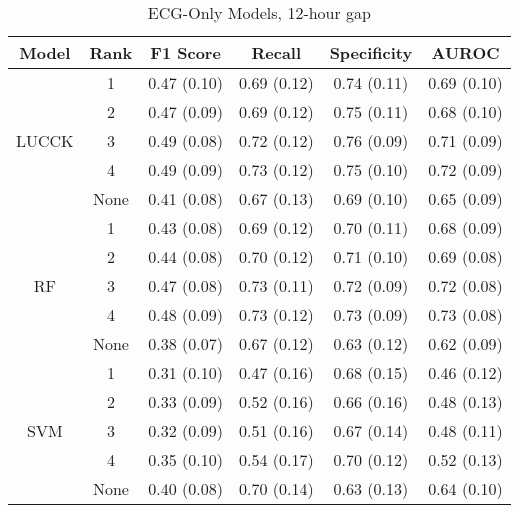 \begin{table}
    \small
    \centering
    \caption{ECG-Only Models, 12-hour gap}
    \begin{tabularx}{\textwidth}{|c|c|C|C|C|C|}
        \hline
        Model & Rank & F1 Score & Recall & Specificity & AUROC \\
        \hline
         & 1 & 0.47 (0.10) & 0.69 (0.12) & 0.74 (0.11) & 0.69 (0.10)\\
         & 2 & 0.47 (0.09) & 0.69 (0.12) & 0.75 (0.11) & 0.68 (0.10)\\
        LUCCK & 3 & 0.49 (0.08) & 0.72 (0.12) & 0.76 (0.09) & 0.71 (0.09)\\
         & 4 & 0.49 (0.09) & 0.73 (0.12) & 0.75 (0.10) & 0.72 (0.09)\\
         & None & 0.41 (0.08) & 0.67 (0.13) & 0.69 (0.10) & 0.65 (0.09)\\
        \hline
        & 1 &  0.43 (0.08) & 0.69 (0.12) & 0.70 (0.11) & 0.68 (0.09)\\
         & 2 & 0.44 (0.08) & 0.70 (0.12) & 0.71 (0.10) & 0.69 (0.08)\\
        RF & 3 & 0.47 (0.08) & 0.73 (0.11) & 0.72 (0.09) & 0.72 (0.08)\\
         & 4 & 0.48 (0.09) & 0.73 (0.12) & 0.73 (0.09) & 0.73 (0.08)\\
         & None & 0.38 (0.07) & 0.67 (0.12) & 0.63 (0.12) & 0.62 (0.09)\\
         \hline
         & 1 & 0.31 (0.10) & 0.47 (0.16) & 0.68 (0.15) & 0.46 (0.12)\\
         & 2 & 0.33 (0.09) & 0.52 (0.16) & 0.66 (0.16) & 0.48 (0.13)\\
        SVM & 3 & 0.32 (0.09) & 0.51 (0.16) & 0.67 (0.14) & 0.48 (0.11)\\
         & 4 & 0.35 (0.10) & 0.54 (0.17) & 0.70 (0.12) & 0.52 (0.13)\\
         & None & 0.40 (0.08) & 0.70 (0.14) & 0.63 (0.13) & 0.64 (0.10)\\
        \hline
    \end{tabularx}
\end{table}


